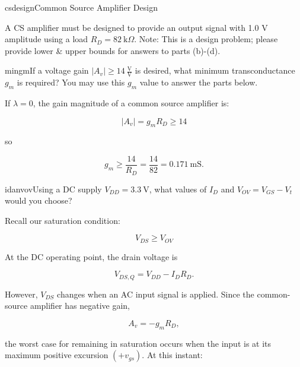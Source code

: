 \begin{mainquestion}{csdesign}{Common Source Amplifier Design}

A CS amplifier must be designed to provide an output signal with 1.0 V amplitude using a load $R_{D} = 82\ \text{k}\Omega$. Note: This is a design problem; please provide lower \& upper bounds for answers to parts (b)-(d).

\begin{partquestion}{mingm}{If a voltage gain $\left|A_{v}\right| \geq 14\ \frac{\text{V}}{\text{V}}$ is desired, what minimum transconductance $g_{m}$ is required? You may use this $g_{m}$ value to answer the parts below.}
\begin{answer}
If $\lambda = 0$, the gain magnitude of a common source amplifier is:

\[
\left|A_{v}\right| = g_{m} R_{D} \geq 14
\]

so

\[
g_{m} \geq \frac{14}{R_{D}} = \frac{14}{82} = 0.171\ \text{mS}.
\]
\end{answer}
\end{partquestion}

\begin{partquestion}{idanvov}{Using a DC supply $V_{DD} = 3.3\ \text{V}$, what values of $I_{D}$ and $V_{OV} = V_{GS} - V_{t}$ would you choose?}
\begin{answer}
\begin{kaitlyn}

\noindent{}%

Recall our saturation condition:

\[\boxed{V_{DS} \geq V_{OV}}\]

At the DC operating point, the drain voltage is

\[V_{DS,Q} = V_{DD} - I_D R_D.\]

However, $V_{DS}$ changes when an AC input signal is applied. Since the common-source amplifier has negative gain,

\[A_v = -g_mR_D,\]

the worst case for remaining in saturation occurs when the input is at its maximum positive excursion $(+v_{gs})$. At this instant:


\end{kaitlyn}
\end{answer}
\end{partquestion}
\end{mainquestion}
